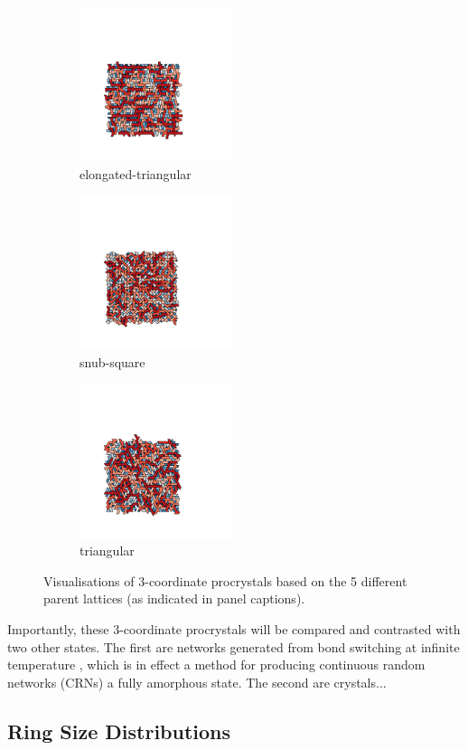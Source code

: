 \begin{figure}[bt]
     \vspace{0.5cm}
     \begin{subfigure}[b]{0.3\textwidth}
         \centering
         \includegraphics[height=4.5cm]{./figures/procrystals/pro_elong3.pdf}
         \caption{elongated\--triangular}
         \label{fig:pro3c}
     \end{subfigure}
     \hfill
     \begin{subfigure}[b]{0.3\textwidth}
         \centering
         \includegraphics[height=4.5cm]{./figures/procrystals/pro_snub3.pdf}
         \caption{snub\--square}
         \label{fig:pro3d}
     \end{subfigure}
     \hfill
     \begin{subfigure}[b]{0.3\textwidth}
         \centering
         \includegraphics[height=4.5cm]{./figures/procrystals/pro_tri3.pdf}
         \caption{triangular}
         \label{fig:pro3e}
     \end{subfigure}
     \hfill
    
     \caption{Visualisations of 3\--coordinate procrystals based on the 5 different parent lattices (as indicated in panel captions).}
     \label{fig:pro3}
\end{figure}

Importantly, these 3\--coordinate procrystals will be compared and contrasted with two other states.
The first are networks generated from bond switching at infinite temperature , which is in effect a method for producing continuous random networks (CRNs) \ie{} a fully amorphous state.
The second are crystals...



\subsection{Ring Size Distributions}